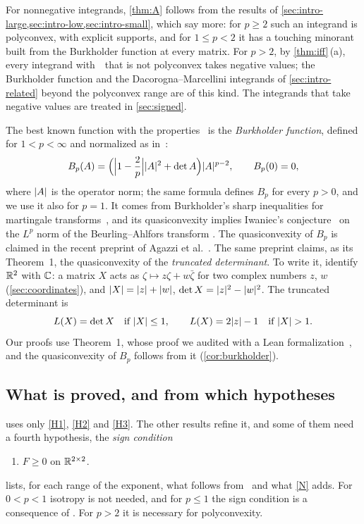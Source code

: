 For nonnegative integrands, \cref{thm:A} follows from the results of
\cref{sec:intro-large,sec:intro-low,sec:intro-small}, which say more: for $p\ge2$ such an
integrand is polyconvex, with explicit supports, and for $1\le p<2$ it has a touching minorant
built from the Burkholder function at every matrix. For $p>2$, by \cref{thm:iff}\,(a), every
integrand with~\Hyp\ that is not polyconvex takes negative values; the Burkholder function and
the Dacorogna--Marcellini integrands of \cref{sec:intro-related} beyond the polyconvex range are
of this kind. The integrands that take negative values are treated in \cref{sec:signed}.

The best known function with the properties \Hyp\ is the \emph{Burkholder function}, defined
for $1<p<\infty$ and normalized as in~\cite[(1.4)]{GuerraKristensen2022}:
\[
  B_p(A)=\Bigl(\Bigl\lvert1-\frac2p\Bigr\rvert\lvert A\rvert^2+\det A\Bigr)\lvert A\rvert^{p-2},\qquad B_p(0)=0,
\]
where $\lvert A\rvert$ is the operator norm; the same formula defines $B_p$ for every $p>0$, and we
use it also for $p=1$. It comes from Burkholder's sharp inequalities for martingale
transforms~\cite{Burkholder1984,Burkholder1988}, and its quasiconvexity implies Iwaniec's
conjecture~\cite{Iwaniec1982} on the $L^p$ norm of the Beurling--Ahlfors transform
\cite{BaernsteinMontgomerySmith1999,Iwaniec2002,AIPS2012,AIPS2015}. The quasiconvexity of
$B_p$ is claimed in the recent preprint of Agazzi et al.~\cite[Corollary~2]{SharpHI}. The same
preprint claims, as its Theorem~1, the quasiconvexity of the \emph{truncated determinant}. To
write it, identify $\mathbb{R}^2$ with $\mathbb{C}$: a matrix $X$ acts as $\zeta\mapsto z\zeta+w\bar\zeta$ for
two complex numbers $z$, $w$ (\cref{sec:coordinates}), and $\lvert X\rvert=\lvert z\rvert+\lvert w\rvert$,
$\det X=\lvert z\rvert^2-\lvert w\rvert^2$. The truncated determinant is
\begin{equation}\label{eq:truncated}
  L(X)=\det X\quad\text{if }\lvert X\rvert\le1,\qquad L(X)=2\lvert z\rvert-1\quad\text{if }\lvert X\rvert>1 .
\end{equation}
Our proofs use Theorem~1, whose proof we audited with a Lean formalization~\cite{IwaniecLean},
and the quasiconvexity of $B_p$ follows from it (\cref{cor:burkholder}).

\subsection{What is proved, and from which hypotheses}\label{sec:intro-table}

 uses only \ref{H1}, \ref{H2} and \ref{H3}. The other results refine it, and some
of them need a fourth hypothesis, the \emph{sign condition}
\begin{enumerate}[label=\textup{(N)}]
\item\label{N} $F\ge0$ on $\mathbb{R}^{2\times 2}$.
\end{enumerate}
 lists, for each range of the exponent, what follows from \Hyp\ and what
\ref{N} adds. For $0<p<1$ isotropy is not needed, and for $p\le1$ the sign condition is a
consequence of \Hyp. For $p>2$ it is necessary for polyconvexity.

